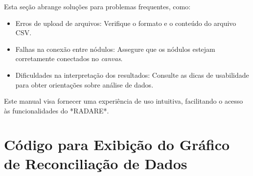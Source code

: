 Esta seção abrange soluções para problemas frequentes, como:
\begin{itemize}
    \item Erros de upload de arquivos: Verifique o formato e o conteúdo do arquivo CSV.
    \item Falhas na conexão entre nódulos: Assegure que os nódulos estejam corretamente conectados no \textit{canvas}.
    \item Dificuldades na interpretação dos resultados: Consulte as dicas de usabilidade para obter orientações sobre análise de dados.
\end{itemize}

Este manual visa fornecer uma experiência de uso intuitiva, facilitando o acesso às funcionalidades do *RADARE*.


\chapter{Código para Exibição do Gráfico de Reconciliação de Dados}
\label{Anexo:graphDisplayCode}

